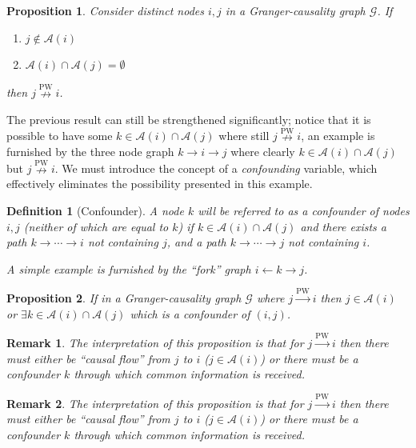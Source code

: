 \documentclass{statsoc}
\def\pwgc{\overset{\text{PW}}{\rightarrow}}  %
\def\npwgc{\overset{\text{PW}}{\nrightarrow}}  %
\def\gcg{\mathcal{G}}  %
\newcommand{\anc}[1]{\mathcal{A}(#1)}  %
\newcommand{\gcgpath}[2]{#1 \rightarrow \cdots \rightarrow #2}  %
\newtheorem{proposition}{Proposition}
\newtheorem{remark}{Remark}
\newtheorem{definition}{Definition}
\begin{document}
\begin{proposition}
  Consider distinct nodes $i, j$ in a Granger-causality graph $\gcg$.
  If

  \begin{enumerate}[label=(\alph*)]
    \item{$j \not\in \anc{i}$}
    \item{$\anc{i}\cap\anc{j} = \emptyset$}
  \end{enumerate}

  then $j \npwgc i$.
\end{proposition}

The previous result can still be strengthened significantly; notice
that it is possible to have some $k \in \anc{i} \cap \anc{j}$ where still
$j \npwgc i$, an example is furnished by the three node graph
$k \rightarrow i \rightarrow j$ where clearly
$k \in \anc{i}\cap\anc{j}$ but $j \npwgc i$.  We must introduce the concept
of a \textit{confounding} variable, which effectively eliminates the
possibility presented in this example.

\begin{definition}[Confounder]
  A node $k$ will be referred to as a \textit{confounder} of nodes
  $i, j$ (neither of which are equal to $k$) if
  $k \in \anc{i} \cap \anc{j}$ and there exists a path
  $\gcgpath{k}{i}$ not containing $j$, and a path $\gcgpath{k}{j}$
  not containing $i$.

  A simple example is furnished by the ``fork'' graph
  $i \leftarrow k \rightarrow j$.
\end{definition}

\begin{proposition}
  \label{prop:ancestor_properties}
  If in a Granger-causality graph $\gcg$ where $j \pwgc i$ then
  $j \in \anc{i}$ or $\exists k \in \anc{i} \cap\anc{j}$ which is a
  confounder of $(i, j)$.
\end{proposition}

\begin{remark}
  The interpretation of this proposition is that for $j \pwgc i$ then
  there must either be ``causal flow'' from $j$ to $i$
  ($j \in \anc{i}$) or there must be a confounder $k$ through which
  common information is received.
\end{remark}

\begin{remark}
  The interpretation of this proposition is that for $j \pwgc i$ then
  there must either be ``causal flow'' from $j$ to $i$
  ($j \in \anc{i}$) or there must be a confounder $k$ through which
  common information is received.
\end{remark}
\end{document}
